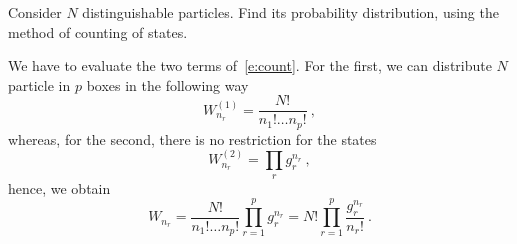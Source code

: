     \begin{exercise}
        Consider $N$ distinguishable particles. Find its probability distribution, using the method of counting of states.
    \end{exercise}

    We have to evaluate the two terms of~\eqref{e:count}. For the first, we can distribute $N$ particle in $p$ boxes in the following way 
    \begin{equation*}
        W^{(1)}_{n_r} = \frac{N!}{n_1! \ldots n_p!} ~,
    \end{equation*}
    whereas, for the second, there is no restriction for the states 
    \begin{equation*}
        W^{(2)}_{n_r} = \prod_r g_r^{n_r} ~,
    \end{equation*}
    hence, we obtain
    \begin{equation*}
        W_{n_r} = \frac{N!}{n_1! \ldots n_p!} \prod_{r=1}^p g_r^{n_r} = N! \prod_{r=1}^p \frac{g_r^{n_r}}{n_r!} ~.
    \end{equation*}

